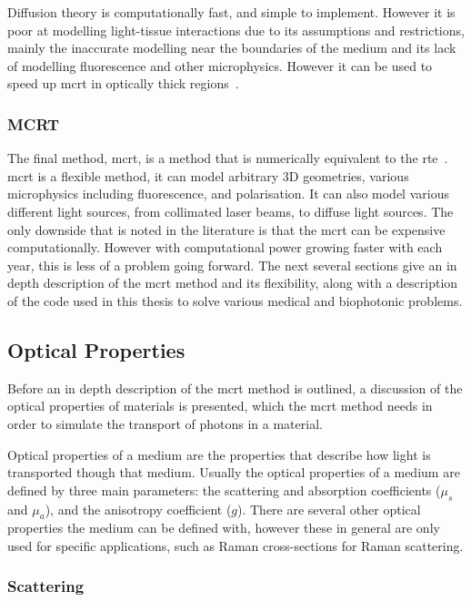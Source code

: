 Diffusion theory is computationally fast, and simple to implement. However it is poor at modelling light-tissue interactions due to its assumptions and restrictions, mainly the inaccurate modelling near the boundaries of the medium and its lack of modelling fluorescence and other microphysics. However it can be used to speed up \gls*{mcrt} in optically thick regions~\cite{robitaille2010modified,min2009radiative}.

\subsubsection*{MCRT}
The final method, \gls*{mcrt}, is a method that is numerically equivalent to the \gls*{rte}~\cite{wang2012biomedical}. \gls*{mcrt} is a flexible method, it can model arbitrary 3D geometries, various microphysics including fluorescence, and polarisation. It can also model various different light sources, from collimated laser beams, to diffuse light sources. The only downside that is noted in the literature is that the \gls*{mcrt} can be expensive computationally. However with computational power growing faster with each year, this is less of a problem going forward. The next several sections give an in depth description of the \gls*{mcrt} method and its flexibility, along with a description of the code used in this thesis to solve various medical and biophotonic problems.

\subsection{Optical Properties}\label{sec:optprop}

Before an in depth description of the \gls*{mcrt} method is outlined, a discussion of the optical properties of materials is presented, which the \gls*{mcrt} method needs in order to simulate the transport of photons in a material.

Optical properties of a medium are the properties that describe how light is transported though that medium. Usually the optical properties of a medium are defined by three main parameters: the scattering and absorption coefficients ($\mu_s$ and $\mu_a$), and the anisotropy coefficient ($g$). There are several other optical properties the medium can be defined with, however these in general are only used for specific applications, such as Raman cross-sections for Raman scattering.

\subsubsection*{Scattering}\label{sec:scatt}

